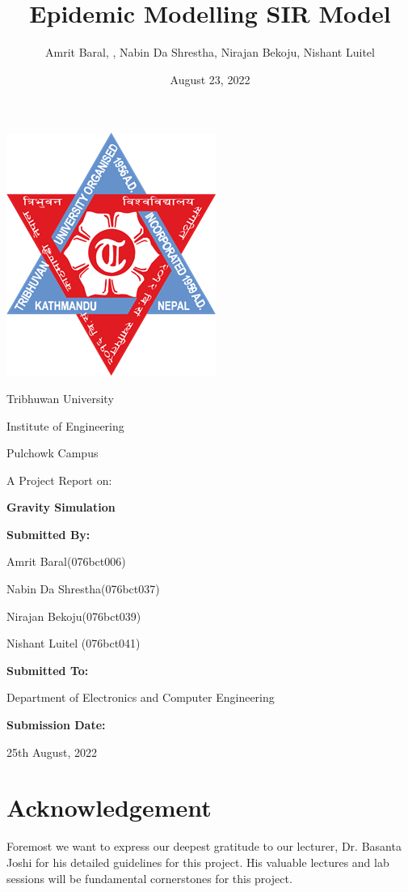 \documentclass[12pt]{article}
\title{Epidemic Modelling SIR Model}
\author{Amrit Baral, , Nabin Da Shrestha, Nirajan Bekoju, Nishant Luitel}
\date{August 23, 2022}
\begin{document}
  

\bigskip
\bigskip
\bigskip
\bigskip

\begin{center}
\includegraphics[scale = 0.5]{logo.png}

Tribhuwan University

Institute of Engineering

Pulchowk Campus

\bigskip
\bigskip
\bigskip
\bigskip

\noindent\makebox[\linewidth]
{\rule{15cm}{0.4pt}}
A Project Report on:

\textbf{\large Gravity Simulation}
\noindent\makebox[\linewidth]
{\rule{15cm}{0.4pt}}

\bigskip
\bigskip
\bigskip
\bigskip
\textbf{Submitted By:}

Amrit Baral(076bct006)

Nabin Da Shrestha(076bct037)

Nirajan Bekoju(076bct039)

Nishant Luitel (076bct041)

\bigskip
\bigskip
\bigskip
\bigskip
\textbf{Submitted To:}

Department of Electronics and Computer Engineering

\bigskip
\bigskip
\bigskip
\bigskip
\textbf{Submission Date:} 

25th August, 2022

\end{center}



\clearpage

\section{Acknowledgement}
Foremost we want to express our deepest gratitude to our lecturer, Dr. Basanta Joshi
for his detailed guidelines for this project. His valuable lectures and lab sessions will be
fundamental cornerstones for this project.
\end{document}
